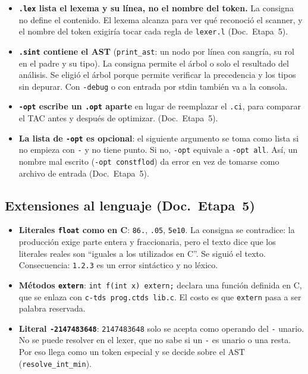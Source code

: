 \documentclass[11pt,a4paper]{article}
\newcommand{\code}[1]{\texttt{#1}}
\newcommand{\doc}[1]{(Doc.\ Etapa~#1)}
\begin{document}
\begin{itemize}
  \item \textbf{\code{.lex} lista el lexema y su línea, no el nombre del token.} La consigna no define el contenido. El lexema alcanza para ver qué reconoció el scanner, y el nombre del token exigiría tocar cada regla de \code{lexer.l} \doc{5}.
  \item \textbf{\code{.sint} contiene el AST} (\code{print\_ast}: un nodo por línea con sangría, su rol en el padre y su tipo). La consigna permite el árbol o solo el resultado del análisis. Se eligió el árbol porque permite verificar la precedencia y los tipos sin depurar. Con \code{-debug} o con entrada por stdin también va a la consola.
  \item \textbf{\code{-opt} escribe un \code{.opt} aparte} en lugar de reemplazar el \code{.ci}, para comparar el TAC antes y después de optimizar. \doc{5}.
  \item \textbf{La lista de \code{-opt} es opcional}: el siguiente argumento se toma como lista si no empieza con \code{-} y no tiene punto. Si no, \code{-opt} equivale a \code{-opt all}. Así, un nombre mal escrito (\code{-opt constflod}) da error en vez de tomarse como archivo de entrada \doc{5}.
\end{itemize}

\subsection*{Extensiones al lenguaje \doc{5}}

\begin{itemize}
  \item \textbf{Literales \code{float} como en C}: \code{86.}, \code{.05}, \code{5e10}. La consigna se contradice: la producción exige parte entera y fraccionaria, pero el texto dice que los literales reales son ``iguales a los utilizados en C''. Se siguió el texto. Consecuencia: \code{1.2.3} es un error sintáctico y no léxico.
  \item \textbf{Métodos \code{extern}}: \code{int f(int x) extern;} declara una función definida en C, que se enlaza con \code{c-tds prog.ctds lib.c}. El costo es que \code{extern} pasa a ser palabra reservada.
  \item \textbf{Literal \code{-2147483648}}: \code{2147483648} solo se acepta como operando del \code{-} unario. No se puede resolver en el lexer, que no sabe si un \code{-} es unario o una resta. Por eso llega como un token especial y se decide sobre el AST (\code{resolve\_int\_min}).
\end{itemize}
\end{document}
